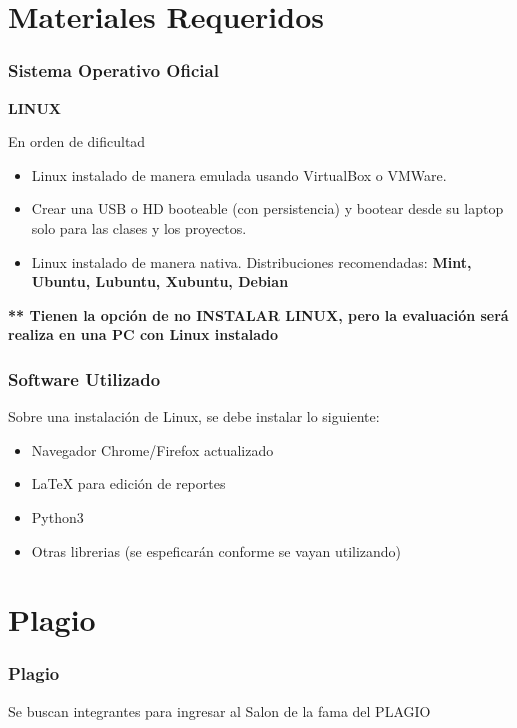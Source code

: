 \documentclass[aspectratio=169]{beamer}
\begin{document}
\section{Materiales Requeridos}

\begin{frame}
\frametitle{Sistema Operativo Oficial}

\textbf{LINUX}
\begin{block}{En orden de dificultad}
\begin{itemize}
\item Linux instalado de manera emulada usando VirtualBox o VMWare.
\item Crear una USB o HD booteable (con persistencia) y bootear desde su laptop solo para las clases y los proyectos.
\item Linux instalado de manera nativa. Distribuciones recomendadas: \textbf{Mint, Ubuntu, Lubuntu, Xubuntu, Debian}
\end{itemize}
\end{block}
\textbf{** Tienen la opción de no INSTALAR LINUX, pero la evaluación será realiza en una PC con Linux instalado}
\end{frame}


\begin{frame}
\frametitle{Software Utilizado}
Sobre una instalación de Linux, se debe instalar lo siguiente:
\begin{itemize}
\item Navegador Chrome/Firefox actualizado
\item LaTeX para edición de reportes
\item Python3
\item Otras librerias (se espeficarán conforme se vayan utilizando)
\end{itemize}
\end{frame}

\section{Plagio}


\begin{frame}
\frametitle{Plagio}
\Huge
\begin{center}
Se buscan integrantes para ingresar al Salon de la fama del PLAGIO
\end{center}
\end{frame}
\end{document}
